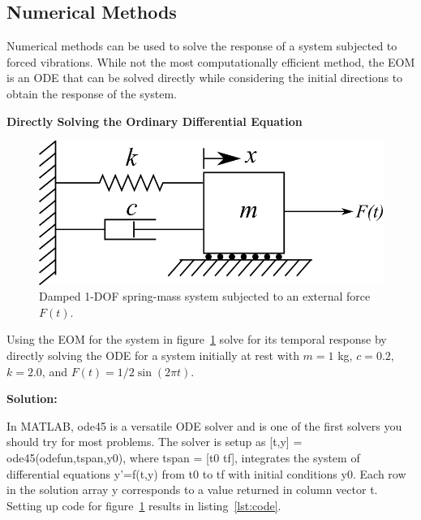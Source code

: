 \documentclass[12pt,letter]{article}
\begin{document}
	\subsection{Numerical Methods}
	
		Numerical methods can be used to solve the response of a system subjected to forced vibrations. While not the most computationally efficient method, the EOM is an ODE that can be solved directly while considering the initial directions to obtain the response of the system. 

\begin{example}
	\textbf{Directly Solving the Ordinary Differential Equation}
	
	\begin{figure}[H]
		\centering
		\includegraphics[]{../figures/1-DOF-spring_dashpot_mass_horizontal_forced.png}
		\caption{Damped 1-DOF spring-mass system subjected to an external force $F(t)$.}
		\label{fig:2-DOF-spring_mass_horizontal_3}
	\end{figure}
	
	
	Using the EOM for the system in figure~\ref{fig:2-DOF-spring_mass_horizontal_3} solve for its temporal response by directly solving the ODE for a system initially at rest with $m=1$ kg, $c=0.2$, $k=2.0$, and $F(t)=1/2 \sin (2 \pi t)$. 
	
	\noindent \textbf{Solution:} 
	
	
	In MATLAB, {\ttfamily{}ode45} is a versatile ODE solver and is one of the first solvers you should try for most problems. The solver is setup as {\ttfamily{}[t,y] = ode45(odefun,tspan,y0),} where {\ttfamily{}tspan = [t0 tf],} integrates the system of differential equations {\ttfamily{}y'=f(t,y)} from {\ttfamily{}t0} to {\ttfamily{}tf} with initial conditions {\ttfamily{}y0}. Each row in the solution array y corresponds to a value returned in column vector {\ttfamily{}t}. Setting up code for figure~\ref{fig:2-DOF-spring_mass_horizontal_3} results in listing~\ref{lst:code}.


\end{example}
\end{document}
